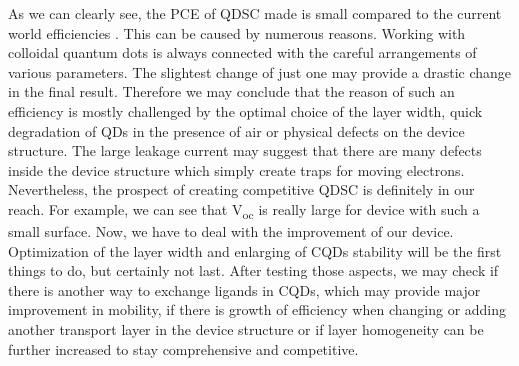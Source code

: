 As we can clearly see, the PCE of QDSC made is small compared to the
current world efficiencies \cite{Kamat2018}. This can be caused by numerous reasons.
Working with colloidal quantum dots is always connected with the careful
arrangements of various parameters. The slightest change of just one may
provide a drastic change in the final result. Therefore we may conclude
that the reason of such an efficiency is mostly challenged by the
optimal choice of the layer width, quick degradation of QDs in the
presence of air or physical defects on the device structure. The large
leakage current may suggest that there are many defects inside the
device structure which simply create traps for moving electrons.
Nevertheless, the prospect of creating competitive QDSC is definitely in
our reach. For example, we can see that V\textsubscript{oc} is really
large for device with such a small surface. Now, we have to deal with
the improvement of our device. Optimization of the layer width and
enlarging of CQDs stability will be the first things to do, but
certainly not last. After testing those aspects, we may check if there
is another way to exchange ligands in CQDs, which may provide major
improvement in mobility, if there is growth of efficiency when changing
or adding another transport layer in the device structure or if layer
homogeneity can be further increased to stay comprehensive and
competitive.





